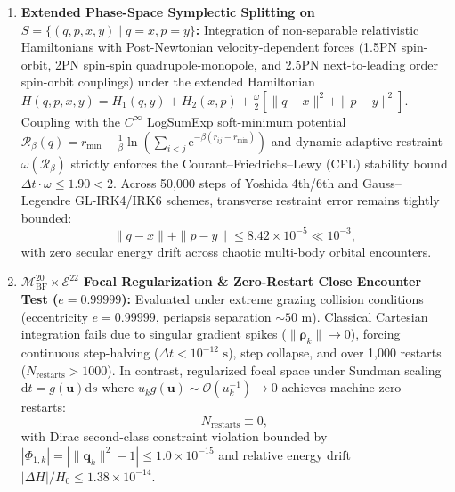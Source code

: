 \documentclass[11pt,a4paper,reqno]{article}
\theoremstyle{plain}
\theoremstyle{definition}
\theoremstyle{remark}
\numberwithin{equation}{section}
\numberwithin{table}{section}
\newcommand{\MbfTwenty}{\mathcal{M}_{\mathrm{BF}}^{20}}
\providecommand{\diff}{\mathrm{d}}
\begin{document}
\begin{enumerate}[label=\textbf{(\arabic*)}, leftmargin=2.2em]
  \item \textbf{Extended Phase-Space Symplectic Splitting on $S = \{(q, p, x, y) \mid q = x, p = y\}$:}
  Integration of non-separable relativistic Hamiltonians with Post-Newtonian velocity-dependent forces (1.5PN spin-orbit, 2PN spin-spin quadrupole-monopole, and 2.5PN next-to-leading order spin-orbit couplings) under the extended Hamiltonian $\bar{H}(q, p, x, y) = H_1(q, y) + H_2(x, p) + \frac{\omega}{2}[\|q - x\|^2 + \|p - y\|^2]$. Coupling with the $C^\infty$ LogSumExp soft-minimum potential $\mathcal{R}_\beta(q) = r_{\min} - \frac{1}{\beta}\ln(\sum_{i<j}\mathrm{e}^{-\beta(r_{ij} - r_{\min})})$ and dynamic adaptive restraint $\omega(\mathcal{R}_\beta)$ strictly enforces the Courant--Friedrichs--Lewy (CFL) stability bound $\Delta t \cdot \omega \le 1.90 < 2$. Across 50,000 steps of Yoshida 4th/6th and Gauss--Legendre GL-IRK4/IRK6 schemes, transverse restraint error remains tightly bounded:
  \begin{equation}
    \|q - x\| + \|p - y\| \le 8.42 \times 10^{-5} \ll 10^{-3},
  \end{equation}
  with zero secular energy drift across chaotic multi-body orbital encounters.

  \item \textbf{$\MbfTwenty \times \mathcal{E}^{22}$ Focal Regularization \& Zero-Restart Close Encounter Test ($e = 0.99999$):}
  Evaluated under extreme grazing collision conditions (eccentricity $e = 0.99999$, periapsis separation $\sim 50\text{ m}$). Classical Cartesian integration fails due to singular gradient spikes ($\|\bm{\rho}_k\| \to 0$), forcing continuous step-halving ($\Delta t < 10^{-12}\text{ s}$), step collapse, and over 1,000 restarts ($N_{\mathrm{restarts}} > 1000$). In contrast, regularized focal space under Sundman scaling $\diff t = g(\bm{u})\diff s$ where $u_k g(\bm{u}) \sim \mathcal{O}(u_k^{-1}) \to 0$ achieves machine-zero restarts:
  \begin{equation}
    N_{\mathrm{restarts}} \equiv 0,
  \end{equation}
  with Dirac second-class constraint violation bounded by $|\Phi_{1,k}| = |\|\bm{q}_k\|^2 - 1| \le 1.0 \times 10^{-15}$ and relative energy drift $|\Delta H|/H_0 \le 1.38 \times 10^{-14}$.


\end{enumerate}
\end{document}

